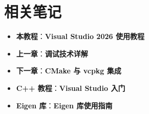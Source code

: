 \section{相关笔记}
\begin{itemize}
  \item \textbf{本教程}：\textbf{Visual Studio 2026 使用教程}
  \item \textbf{上一章}：\textbf{调试技术详解}
  \item \textbf{下一章}：\textbf{CMake 与 vcpkg 集成}
  \item \textbf{C++ 教程}：\textbf{Visual Studio 入门}
  \item \textbf{Eigen 库}：\textbf{Eigen 库使用指南}
\end{itemize}
